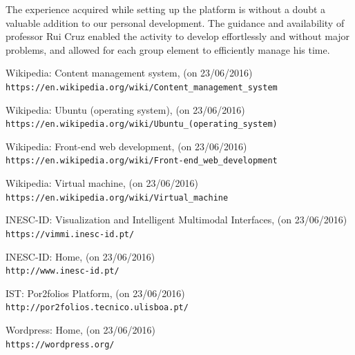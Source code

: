\documentclass[a4paper,12pt,journal,twoside,compsoc]{PPIEEEtran}
\begin{document}
The experience acquired while setting up the platform is without a doubt a valuable addition to our personal development. The guidance and availability of professor Rui Cruz enabled the activity to develop effortlessly and without major problems, and allowed for each group element to efficiently manage his time.


\clearpage

\begin{thebibliography}{9}
% 
 
Wikipedia: Content management system, (on 23/06/2016)
\\\texttt{https://en.wikipedia.org/wiki/Content\_management\_system}

Wikipedia: Ubuntu (operating system), (on 23/06/2016)
\\\texttt{https://en.wikipedia.org/wiki/Ubuntu\_(operating\_system)}

Wikipedia: Front-end web development, (on 23/06/2016)
\\\texttt{https://en.wikipedia.org/wiki/Front-end\_web\_development}

Wikipedia: Virtual machine, (on 23/06/2016)
\\\texttt{https://en.wikipedia.org/wiki/Virtual\_machine}

INESC-ID: Visualization and Intelligent Multimodal Interfaces, (on 23/06/2016)
\\\texttt{https://vimmi.inesc-id.pt/}

INESC-ID: Home, (on 23/06/2016)
\\\texttt{http://www.inesc-id.pt/}

IST: Por2folios Platform, (on 23/06/2016)
\\\texttt{http://por2folios.tecnico.ulisboa.pt/}

Wordpress: Home, (on 23/06/2016)
\\\texttt{https://wordpress.org/}

\end{thebibliography}
\end{document}

